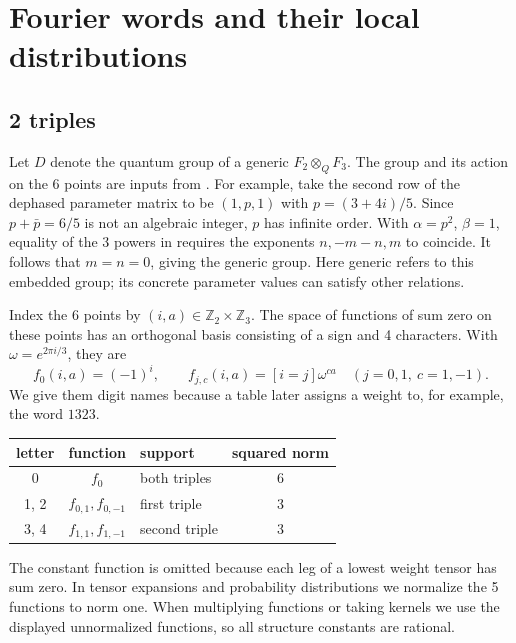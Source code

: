 \documentclass[11pt,a4paper]{amsart}
\begin{document}
\section{Fourier words and their local distributions}\label{sec:exact}

\subsection{2 triples}
Let $D$ denote the quantum group of a generic $F_2\otimes_Q F_3$. The group and its action on the 6 points are inputs from \cite[Sections 4.1--4.3]{bo}. For example, take the second row of the dephased parameter matrix to be $(1,p,1)$ with $p=(3+4i)/5$. Since $p+\bar p=6/5$ is not an algebraic integer, $p$ has infinite order. With $\alpha=p^2$, $\beta=1$, equality of the 3 powers in \cite[Theorem 4.6]{bo} requires the exponents $n,-m-n,m$ to coincide. It follows that $m=n=0$, giving the generic group. Here generic refers to this embedded group; its concrete parameter values can satisfy other relations.

Index the 6 points by $(i,a)\in\mathbb Z_2\times\mathbb Z_3$. The space of functions of sum zero on these points has an orthogonal basis consisting of a sign and 4 characters. With $\omega=e^{2\pi i/3}$, they are
\[
 f_0(i,a)=(-1)^i,\qquad f_{j,c}(i,a)=[i=j]\omega^{ca}
 \quad(j=0,1,\ c=1,-1).
\]
We give them digit names because a table later assigns a weight to, for example, the word $1323$.
\begin{center}
\begin{tabular}{cclc}
\toprule
letter & function & support & squared norm\\ \midrule
0 & $f_0$ & both triples & 6\\
1, 2 & $f_{0,1},f_{0,-1}$ & first triple & 3\\
3, 4 & $f_{1,1},f_{1,-1}$ & second triple & 3\\ \bottomrule
\end{tabular}
\end{center}
The constant function is omitted because each leg of a lowest weight tensor has sum zero. In tensor expansions and probability distributions we normalize the 5 functions to norm one. When multiplying functions or taking kernels we use the displayed unnormalized functions, so all structure constants are rational.
\end{document}
